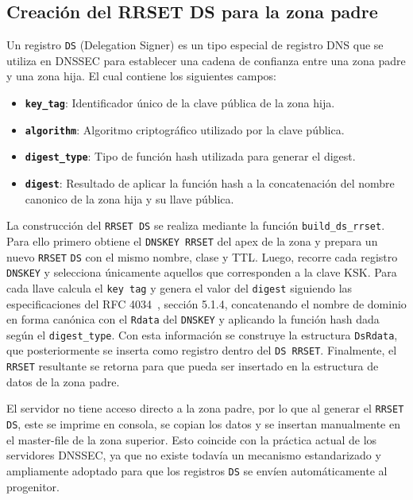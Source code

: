 \subsection{Creación del RRSET DS para la zona padre}

Un registro \texttt{DS} (Delegation Signer) es un tipo especial de registro DNS que se utiliza en DNSSEC para establecer una cadena de confianza entre una zona padre y una zona hija.
El cual contiene los siguientes campos:

\begin{itemize}
    \item \textbf{\texttt{key\_tag}}: Identificador único de la clave pública de la zona hija.
    \item \textbf{\texttt{algorithm}}: Algoritmo criptográfico utilizado por la clave pública.
    \item \textbf{\texttt{digest\_type}}: Tipo de función hash utilizada para generar el digest.
    \item \textbf{\texttt{digest}}: Resultado de aplicar la función hash a la concatenación del nombre canonico de la zona hija y su llave pública.
\end{itemize}

La construcción del \texttt{RRSET DS} se realiza mediante la función \texttt{build\_ds\_rrset}. Para ello
primero obtiene el \texttt{DNSKEY RRSET} del apex de la zona y prepara un nuevo \texttt{RRSET} \texttt{DS} con el mismo nombre, clase y TTL. Luego, recorre cada registro \texttt{DNSKEY} y 
selecciona únicamente aquellos que corresponden a la clave KSK. Para cada llave calcula el \texttt{key tag} y genera el valor del 
\texttt{digest} siguiendo las especificaciones del RFC 4034~\cite{RFC4034}, sección 5.1.4, concatenando el nombre de dominio en forma canónica con el \texttt{Rdata} del \texttt{DNSKEY} y aplicando la función hash dada según el \texttt{digest\_type}. 
Con esta información se construye la estructura \texttt{DsRdata}, que posteriormente se inserta como registro dentro del \texttt{DS RRSET}. Finalmente, el \texttt{RRSET} resultante se 
retorna para que pueda ser insertado en la estructura de datos de la zona padre.

El servidor no tiene acceso directo a la zona padre, por lo que al generar el \texttt{RRSET DS}, este se imprime en consola, se copian los datos y se insertan manualmente en el 
master-file de la zona superior. Esto coincide con la práctica actual de los servidores DNSSEC, ya que no existe todavía un mecanismo estandarizado y ampliamente adoptado para que los registros 
\texttt{DS} se envíen automáticamente al progenitor.

